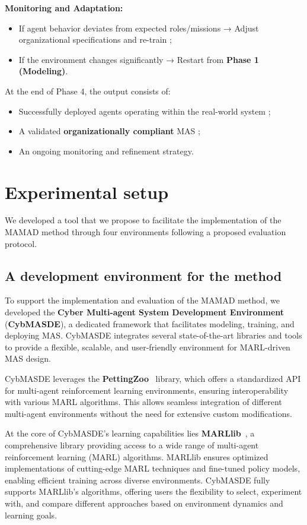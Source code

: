 \documentclass[pdflatex,sn-mathphys-num]{sn-jnl}%
\theoremstyle{thmstyleone}%
\theoremstyle{thmstyletwo}%
\theoremstyle{thmstylethree}%
\begin{document}
\noindent \textbf{Monitoring and Adaptation:}
\begin{itemize}
    \item If agent behavior deviates from expected roles/missions → Adjust organizational specifications and re-train ;
    \item If the environment changes significantly → Restart from \textbf{Phase 1 (Modeling)}.
\end{itemize}

At the end of Phase 4, the output consists of:
\begin{itemize}
    \item Successfully deployed agents operating within the real-world system ;
    \item A validated \textbf{organizationally compliant} MAS ;
    \item An ongoing monitoring and refinement strategy.
\end{itemize}



\section{Experimental setup}
\label{sec:experimental_setup}

We developed a tool that we propose to facilitate the implementation of the MAMAD method through four environments following a proposed evaluation protocol.

\subsection{A development environment for the method}

To support the implementation and evaluation of the MAMAD method, we developed the \textbf{Cyber Multi-agent System Development Environment} (\textbf{CybMASDE}), a dedicated framework that facilitates modeling, training, and deploying MAS. CybMASDE integrates several state-of-the-art libraries and tools to provide a flexible, scalable, and user-friendly environment for MARL-driven MAS design.

CybMASDE leverages the \textbf{PettingZoo}~\cite{Terry2021} library, which offers a standardized API for multi-agent reinforcement learning environments, ensuring interoperability with various MARL algorithms. This allows seamless integration of different multi-agent environments without the need for extensive custom modifications.

At the core of CybMASDE's learning capabilities lies \textbf{MARLlib}~\cite{hu2022marllib}, a comprehensive library providing access to a wide range of multi-agent reinforcement learning (MARL) algorithms. MARLlib ensures optimized implementations of cutting-edge MARL techniques and fine-tuned policy models, enabling efficient training across diverse environments. CybMASDE fully supports MARLlib's algorithms, offering users the flexibility to select, experiment with, and compare different approaches based on environment dynamics and learning goals.
\end{document}
